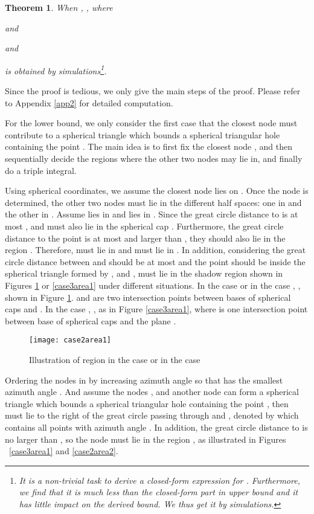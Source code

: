 \documentclass[journal, twoside]{IEEEtran}
\newtheorem{theorem}{Theorem}
\begin{document}
\begin{theorem} \label{trihole2}
	When , 
	,
	where 
	
	and
	
	and
	
	  
	  
	  	 	  	  
	   is obtained by simulations\footnote{It is a non-trivial task to derive a closed-form expression for . Furthermore, we find that it is much less than the closed-form part in upper bound  and it has little impact on the derived bound. We thus get it by simulations.}.
\end{theorem}


Since the proof is tedious, we only give the main steps of the proof.
Please refer to Appendix \ref{app2} for detailed computation. 
 
 For the lower bound, we only consider 
the first case that the closest node  must contribute to a
spherical triangle which bounds a spherical triangular hole containing the point .
The main idea is to first fix the closest node , and then sequentially
decide the regions where the other two nodes may lie in, and finally
do a triple integral.

Using spherical coordinates, we assume the closest node  lies on 
. Once the node  is determined, the other two nodes must lie in 
the different half spaces: one in  
and the other in . 
Assume  lies in  and  lies in .
Since the great circle distance to  is at most ,
 and  must also lie in the spherical cap . Furthermore, the
great circle distance to the point  is at most  and larger than , they
should also lie in the region . Therefore, 
 must lie in  and  must lie in . In addition,
considering the great circle distance between  and  should be at most
 and the point  should be inside the spherical triangle formed by ,
 and ,  must lie
in the shadow region  shown in Figures \ref{case2area1} or \ref{case3area1}
under different situations.
In the case 
or in the case , 
, shown in Figure \ref{case2area1}. 
 and  are two intersection points between bases of spherical caps  and
. In the case , 
, as in Figure \ref{case3area1}, where
 is one intersection point between base of spherical caps  and 
the plane .
\begin{figure}[ht]
  \centering
  \texttt{[image: case2area1]}
  \caption{Illustration of region  in the case  
  	or in the case }
  \label{case2area1}
\end{figure}

Ordering the nodes in  by increasing azimuth angle so that  
has the smallest azimuth angle . And assume the nodes
,  and another node  can form a spherical triangle which bounds a spherical triangular hole containing
the point , then  must lie to the right of the great circle passing
through  and , denoted by  which contains
all points with azimuth angle . In addition, the great circle
distance to  is no larger than , so the node  must lie
in the region , as illustrated in Figures ~\ref{case3area1} and \ref{case2area2}.
\end{document}
